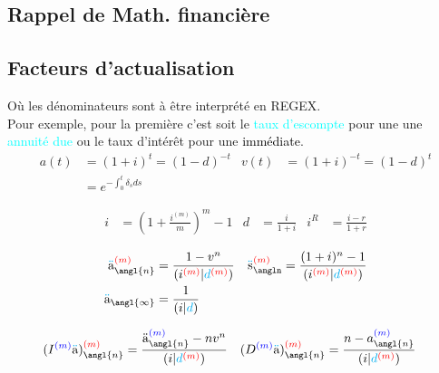 \documentclass[10pt, french]{article}
\newcommand\cumlaut[2][black]{\stackon[.33ex]{#2}{\textcolor{#1}{\kern-.04ex.\kern-.2ex.}}}
\begin{document}
\footnotesize %
\begin{multicols*}{3} 	%
\section*{Rappel de Math. financière}
\subsection*{Facteurs d'actualisation}
Où les dénominateurs sont à être interprété en REGEX.\\
Pour exemple, pour la première c’est soit le \textcolor{cyan}{taux d'escompte} pour une une \textcolor{cyan}{annuité due} ou le taux d'intérêt pour une \textcolor{black}{immédiate}.
\begin{align*}
	a(t) 
		&= 	(1 + i)^{t} 
		= 	(1 - d)^{-t}	&
	v(t) 
		&= 	(1 + i)^{-t} 
		= 	(1 - d)^{t}	 \\
	&= 	e^{-\int_{0}^{t} \delta_s ds} %
\end{align*}

\begin{align*}
	i 	&= \left( 1 + \frac{i^{(m)}}{m} \right)^{m} - 1 &
	d	&= 	\frac{i}{1 + i} &
	i^{R}
		&=	\frac{i - r}{1 + r}
\end{align*}

\begin{align*}
	\cumlaut[cyan]{a}_{\angl{n}}^{\textcolor{red}{(m)}} 
		&= \frac{1 - v^n}{ (i^{\textcolor{red}{(m)}}{\color{black}|}{\color{cyan}d}^{\textcolor{red}{(m)}}{\color{black})}}	&
	\cumlaut[cyan]{s}_{\angln}^{\textcolor{red}{(m)}} 
		&=	\frac{(1+i)^{n} - 1}{(i^{\textcolor{red}{(m)}} | \textcolor{cyan}{d}^{\textcolor{red}{(m)}})}	\\
	\cumlaut[cyan]{a}_{\angl{\infty}} 
		&= \frac{1}{(i|\textcolor{cyan}{d})}
\end{align*}

\begin{align*}
	(I^{\textcolor{blue}{(m)}}\cumlaut[cyan]{a})_{\angl{n}}^{\textcolor{red}{(m)}} 
		&= \frac{\cumlaut[black]{a}_{\angl{n}}^{\textcolor{blue}{(m)}} - nv^n}{(i | \textcolor{cyan}{d}^{\textcolor{red}{(m)}})} &
	(D^{\textcolor{blue}{(m)}}\cumlaut[cyan]{a})_{\angl{n}}^{\textcolor{red}{(m)}} 
		&= \frac{n - a_{\angl{n}}^{\textcolor{blue}{(m)}}}{(i | \textcolor{cyan}{d}^{\textcolor{red}{(m)}})}
\end{align*}


\end{multicols*}
\end{document}
